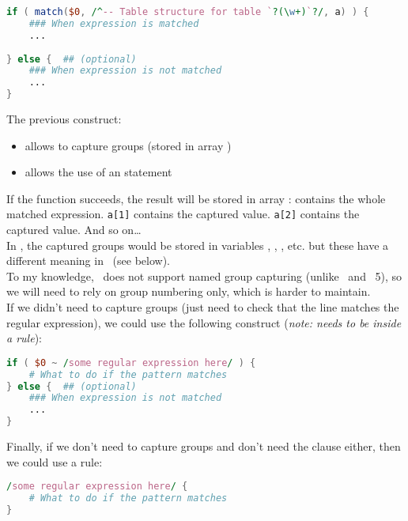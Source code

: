 \begin{lstlisting}[language=awk]
if ( match($0, /^-- Table structure for table `?(\w+)`?/, a) ) {
	### When expression is matched
	...
	
} else {  ## (optional)
	### When expression is not matched
	...
}
\end{lstlisting}

The previous construct:
\begin{itemize}
	\item allows to capture groups (stored in array )
	\item allows the use of an  statement
\end{itemize}

If the  function succeeds, the result will be stored in array : \newline
{} contains the whole matched expression. \newline
\lstinline|a[1]| contains the  captured value. \newline
\lstinline|a[2]| contains the  captured value. \newline
And so on\dots \\

In \perl, the captured groups would be stored in variables , , , etc. but these have a different meaning in \awk\ (see below). \\

To my knowledge, \gawk\ does not support named group capturing (unlike \python\ and \perl\ 5), so we will need to rely on group numbering only, which is harder to maintain. \\


If we didn't need to capture groups (just need to check that the line matches the regular expression), we could use the following construct (\emph{note: needs to be inside a rule}):
\begin{lstlisting}[language=awk]
if ( $0 ~ /some regular expression here/ ) {
	# What to do if the pattern matches
} else {  ## (optional)
	### When expression is not matched
	...
}
\end{lstlisting}

Finally, if we don't need to capture groups and don't need the  clause either, then we could use a rule:
\begin{lstlisting}[language=awk]
/some regular expression here/ {
	# What to do if the pattern matches
}
\end{lstlisting}


